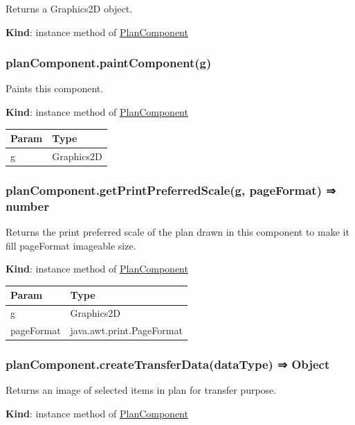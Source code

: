 \documentclass[a4paper]{report}
\begin{document}
Returns a Graphics2D object.

\textbf{Kind}: instance method of
\protect\hyperlink{PlanComponent}{PlanComponent}\\

\hypertarget{plancomponent.paintcomponentg}{%
\subsubsection{planComponent.paintComponent(g)}\label{plancomponent.paintcomponentg}}

Paints this component.

\textbf{Kind}: instance method of
\protect\hyperlink{PlanComponent}{PlanComponent}

\begin{longtable}[]{@{}ll@{}}
\toprule
Param & Type\tabularnewline
\midrule
\endhead
g & Graphics2D\tabularnewline
\bottomrule
\end{longtable}

\hypertarget{plancomponent.getprintpreferredscaleg-pageformat-number}{%
\subsubsection{planComponent.getPrintPreferredScale(g, pageFormat) ⇒
number}\label{plancomponent.getprintpreferredscaleg-pageformat-number}}

Returns the print preferred scale of the plan drawn in this component to
make it fill pageFormat imageable size.

\textbf{Kind}: instance method of
\protect\hyperlink{PlanComponent}{PlanComponent}

\begin{longtable}[]{@{}ll@{}}
\toprule
Param & Type\tabularnewline
\midrule
\endhead
g & Graphics2D\tabularnewline
pageFormat & java.awt.print.PageFormat\tabularnewline
\bottomrule
\end{longtable}

\hypertarget{plancomponent.createtransferdatadatatype-object}{%
\subsubsection{planComponent.createTransferData(dataType) ⇒
Object}\label{plancomponent.createtransferdatadatatype-object}}

Returns an image of selected items in plan for transfer purpose.

\textbf{Kind}: instance method of
\protect\hyperlink{PlanComponent}{PlanComponent}
\end{document}

